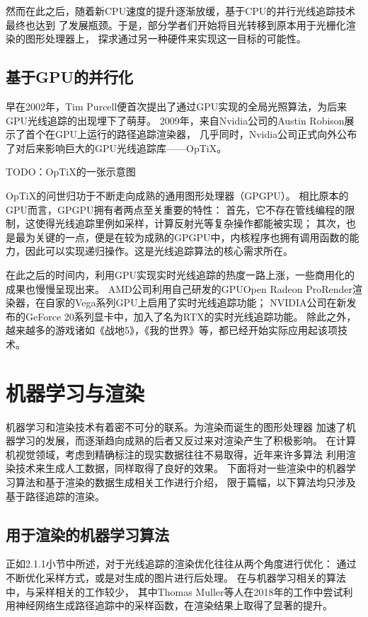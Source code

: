 然而在此之后，随着新CPU速度的提升逐渐放缓，基于CPU的并行光线追踪技术最终也达到
了发展瓶颈。于是，部分学者们开始将目光转移到原本用于光栅化渲染的图形处理器上，
探求通过另一种硬件来实现这一目标的可能性。

\subsection{基于GPU的并行化} 

早在2002年，Tim Purcell便首次提出了通过GPU实现的全局光照算法，为后来GPU光线追踪的出现埋下了萌芽。
2009年，来自Nvidia公司的Austin Robison展示了首个在GPU上运行的路径追踪渲染器，
几乎同时，Nvidia公司正式向外公布了对后来影响巨大的GPU光线追踪库——OpTiX\cite{Optix}。

TODO：OpTiX的一张示意图

OpTiX的问世归功于不断走向成熟的通用图形处理器（GPGPU）。
相比原本的GPU而言，GPGPU拥有者两点至关重要的特性：
首先，它不存在管线编程的限制，这使得光线追踪里例如采样，计算反射光等复杂操作都能被实现；
其次，也是最为关键的一点，便是在较为成熟的GPGPU中，内核程序也拥有调用函数的能力，因此可以实现递归操作。这是光线追踪算法的核心需求所在。

在此之后的时间内，利用GPU实现实时光线追踪的热度一路上涨，一些商用化的成果也慢慢呈现出来。
AMD公司利用自己研发的GPUOpen Radeon ProRender渲染器，在自家的Vega系列GPU上启用了实时光线追踪功能\cite{Vega}；
NVIDIA公司在新发布的GeForce 20系列显卡中，加入了名为RTX的实时光线追踪功能\cite{RTXOn}。
除此之外，越来越多的游戏诸如《战地5》，《我的世界》等，都已经开始实际应用起该项技术。

\section{机器学习与渲染}

机器学习和渲染技术有着密不可分的联系。为渲染而诞生的图形处理器
加速了机器学习的发展，而逐渐趋向成熟的后者又反过来对渲染产生了积极影响。
在计算机视觉领域，考虑到精确标注的现实数据往往不易取得，近年来许多算法
利用渲染技术来生成人工数据，同样取得了良好的效果。
下面将对一些渲染中的机器学习算法和基于渲染的数据生成相关工作进行介绍，
限于篇幅，以下算法均只涉及基于路径追踪的渲染。

\subsection{用于渲染的机器学习算法}

正如2.1.1小节中所述，对于光线追踪的渲染优化往往从两个角度进行优化：
通过不断优化采样方式，或是对生成的图片进行后处理。
在与机器学习相关的算法中，与采样相关的工作较少，
其中Thomas Muller等人在2018年的工作中尝试利用神经网络生成路径追踪中的采样函数\cite{neuralImportanceSampling}，在渲染结果上取得了显著的提升。

